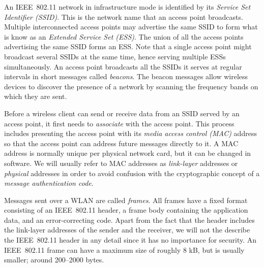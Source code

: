 An IEEE~802.11 network in infrastructure mode is identified by its \emph{Service Set Identifier (SSID)}.
This is the network name that an access point broadcasts.
Multiple interconnected access points may advertise the same SSID to form what is know as an \emph{Extended Service Set (ESS)}. 
The union of all the access points advertising the same SSID forms an ESS. 
Note that a single access point might broadcast several SSIDs at the same time,
hence serving multiple ESSs simultaneously.
An access point broadcasts all the SSIDs it serves at regular intervals in short messages called \emph{beacons}.
The beacon messages allow wireless devices to discover the presence of a network by scanning the frequency bands on which they are sent.

Before a wireless client can send or receive data from an SSID served by an access point,
it first needs to \emph{associate} with the access point. 
This process includes presenting the access point with its \emph{media access control (MAC)} address so that the access point can address future messages directly to it.
A MAC address is normally unique per physical network card,
but it can be changed in software.
We will usually refer to MAC addresses as \emph{link-layer} addresses or \emph{physical} addresses in order to avoid confusion with the cryptographic concept of a \emph{message authentication code}.

Messages sent over a WLAN are called \emph{frames}.
All frames have a fixed format consisting of an IEEE~802.11 header, a frame body containing the application data,
and an error-correcting code.
Apart from the fact that the header includes the link-layer addresses of the sender and the receiver,
we will not the describe the IEEE~802.11 header in any detail since it has no importance for security. 
An IEEE~802.11 frame can have a maximum size of roughly 8 kB,
but is usually smaller;
around 200--2000 bytes.

